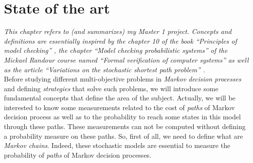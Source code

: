 \chapter{State of the art}
\textit{This chapter refers to (and summarizes) my Master 1 project. Concepts and definitions are essentially inspired by the chapter 10 of the book ``Principles of model checking'' \cite{PMC}, the chapter ``Model checking probabilistic systems'' of the Mickael Randour course named ``Formal verification of computer systems'' \cite{MRV} as well as the article ``Variations on the stochastic shortest path problem'' \cite{DBLP:journals/corr/RandourRS14a}.} \\

Before studying different multi-objective problems in \textit{Markov decision
processes} and defining \textit{strategies} that solve such problems, we will introduce some fundamental concepts that define the area of the subject.
Actually, we will be interested to know some measurements related to the cost of \textit{paths} of Markov decision process as well as to the probability to reach some states in this model through these paths.
These measurements can not be computed without defining a probability measure on these paths.
So, first of all, we need to define what are \textit{Markov chains}. Indeed, these
stochastic models are essential to measure the probability of \textit{paths} of Markov decision processes.

